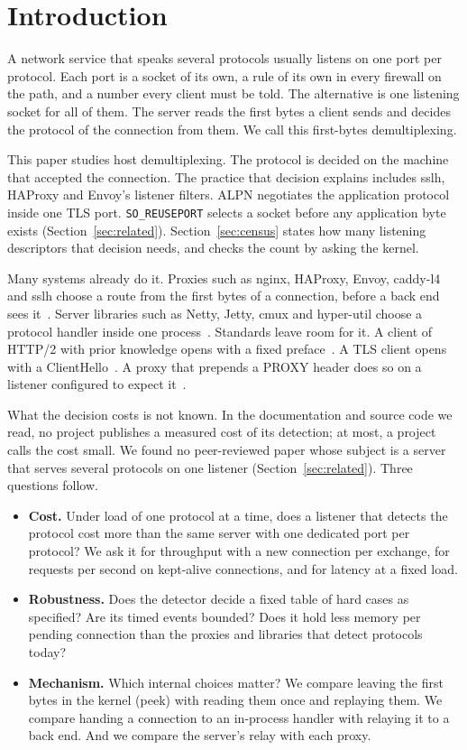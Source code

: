 \section{Introduction}\label{sec:intro}

A network service that speaks several protocols usually listens on one port per protocol. Each
port is a socket of its own, a rule of its own in every firewall on the path, and a number every
client must be told. The alternative is one listening socket for all of them. The server reads
the first bytes a client sends and decides the protocol of the connection from them. We call this
first-bytes demultiplexing.

This paper studies host demultiplexing. The protocol is decided on the machine that accepted the
connection. The practice that decision explains includes sslh, HAProxy and Envoy's listener filters.
ALPN negotiates the application protocol inside one TLS port.
\texttt{SO\_REUSEPORT} selects a socket before any application byte exists
(Section~\ref{sec:related}). Section~\ref{sec:census} states how many listening descriptors that
decision needs, and checks the count by asking the kernel.

Many systems already do it. Proxies such as nginx, HAProxy, Envoy, caddy-l4 and sslh choose a
route from the first bytes of a connection, before a back end sees
it~\cite{nginx2026,haproxy2026,envoy2026,caddyl42026,sslh2026}. Server libraries such as Netty,
Jetty, cmux and hyper-util choose a protocol handler inside one
process~\cite{netty2026,jetty2026,cmux2021,hyperutil2026}. Standards leave room for it. A client
of HTTP/2 with prior knowledge opens with a fixed preface~\cite{thomson2022rfc9113}. A TLS client
opens with a ClientHello~\cite{rescorla2018rfc8446}. A proxy that prepends a PROXY header does so
on a listener configured to expect it~\cite{tarreau2026proxy}.

What the decision costs is not known. In the documentation and source code we read, no project
publishes a measured cost of its detection; at most, a project calls the cost small. We found no
peer-reviewed paper whose subject is a server that serves several protocols on one listener
(Section~\ref{sec:related}). Three questions follow.
\begin{itemize}
\item \textbf{Cost.} Under load of one protocol at a time, does a listener that detects the
protocol cost more than the same server with one dedicated port per protocol? We ask it for
throughput with a new connection per exchange, for requests per second on kept-alive connections,
and for latency at a fixed load.
\item \textbf{Robustness.} Does the detector decide a fixed table of hard cases as specified? Are
its timed events bounded? Does it hold less memory per pending connection than the proxies and
libraries that detect protocols today?
\item \textbf{Mechanism.} Which internal choices matter? We compare leaving the first bytes in the
kernel (peek) with reading them once and replaying them. We compare handing a connection to an
in-process handler with relaying it to a back end. And we compare the server's relay with each
proxy.
\end{itemize}

